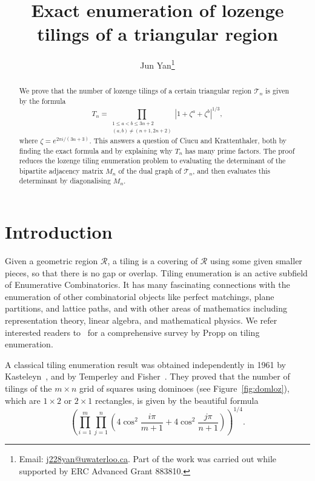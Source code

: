 \documentclass{article}
\title{Exact enumeration of lozenge tilings of a triangular region}
\author{Jun Yan\thanks{Email: \url{j228yan@uwaterloo.ca}. Part of the work was carried out while supported by
ERC Advanced Grant 883810.}}
\date{}
\begin{document}
\maketitle
\begin{abstract}
We prove that the number of lozenge tilings of a certain triangular region $\mathcal{T}_n$ is given by the formula
\[T_n=\prod_{\substack{1\leq a<b\leq 3n+2\\(a,b)\not=(n+1,2n+2)}}\left|1+\zeta^a+\zeta^b\right|^{1/3},\]
where $\zeta=e^{2\pi i/(3n+3)}$.
This answers a question of Ciucu and Krattenthaler, both by finding the exact formula and by explaining why $T_n$ has many prime factors. The proof reduces the lozenge tiling enumeration problem to evaluating the determinant of the bipartite adjacency matrix $M_n$ of the dual graph of $\mathcal{T}_n$, and then evaluates this determinant by diagonalising $M_n$.
\end{abstract}

\section{Introduction}\label{sec:intro}
Given a geometric region $\mathcal{R}$, a tiling is a covering of $\mathcal{R}$ using some given smaller pieces, so that there is no gap or overlap. Tiling enumeration is an active subfield of Enumerative Combinatorics. It has many fascinating connections with the enumeration of other combinatorial objects like perfect matchings, plane partitions, and lattice paths, and with other areas of mathematics including representation theory, linear algebra, and mathematical physics. We refer interested readers to~\cite{Propp} for a comprehensive survey by Propp on tiling enumeration.

A classical tiling enumeration result was obtained independently in 1961 by Kasteleyn~\cite{K}, and by Temperley and Fisher~\cite{TF}. They proved that the number of tilings of the $m\times n$ grid of squares using dominoes (see Figure~\ref{fig:domloz}), which are $1\times2$ or $2\times1$ rectangles, is given by the beautiful formula
\[\left(\prod_{i=1}^m\prod_{j=1}^n\left(4\cos^2\frac{i\pi}{m+1}+4\cos^2\frac{j\pi}{n+1}\right)\right)^{1/4}.\]
\end{document}
